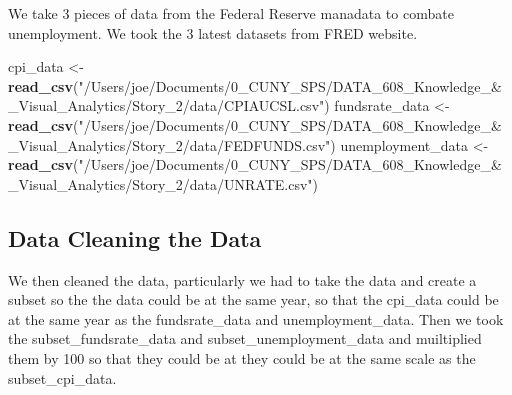 \documentclass[
]{article}
\newenvironment{Shaded}{\begin{snugshade}}{\end{snugshade}}
\newcommand{\FunctionTok}[1]{\textcolor[rgb]{0.13,0.29,0.53}{\textbf{#1}}}
\newcommand{\NormalTok}[1]{#1}
\newcommand{\OtherTok}[1]{\textcolor[rgb]{0.56,0.35,0.01}{#1}}
\newcommand{\StringTok}[1]{\textcolor[rgb]{0.31,0.60,0.02}{#1}}
\begin{document}
We take 3 pieces of data from the Federal Reserve manadata to combate
unemployment. We took the 3 latest datasets from FRED website.

\begin{Shaded}
\begin{Highlighting}[]
\NormalTok{cpi\_data }\OtherTok{\textless{}{-}} \FunctionTok{read\_csv}\NormalTok{(}\StringTok{"/Users/joe/Documents/0\_CUNY\_SPS/DATA\_608\_Knowledge\_\&\_Visual\_Analytics/Story\_2/data/CPIAUCSL.csv"}\NormalTok{)}
\NormalTok{fundsrate\_data }\OtherTok{\textless{}{-}} \FunctionTok{read\_csv}\NormalTok{(}\StringTok{"/Users/joe/Documents/0\_CUNY\_SPS/DATA\_608\_Knowledge\_\&\_Visual\_Analytics/Story\_2/data/FEDFUNDS.csv"}\NormalTok{)}
\NormalTok{unemployment\_data }\OtherTok{\textless{}{-}} \FunctionTok{read\_csv}\NormalTok{(}\StringTok{"/Users/joe/Documents/0\_CUNY\_SPS/DATA\_608\_Knowledge\_\&\_Visual\_Analytics/Story\_2/data/UNRATE.csv"}\NormalTok{)}
\end{Highlighting}
\end{Shaded}

\subsection{Data Cleaning the Data}\label{data-cleaning-the-data}

We then cleaned the data, particularly we had to take the data and
create a subset so the the data could be at the same year, so that the
cpi\_data could be at the same year as the fundsrate\_data and
unemployment\_data. Then we took the subset\_fundsrate\_data and
subset\_unemployment\_data and muiltiplied them by 100 so that they
could be at they could be at the same scale as the subset\_cpi\_data.
\end{document}
